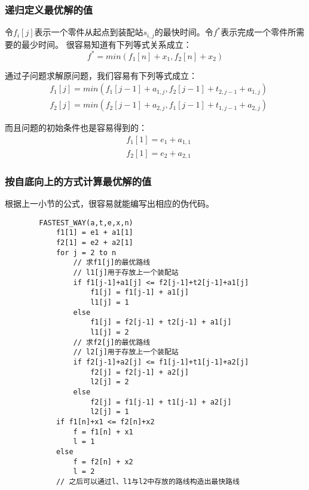 \documentclass[a4paper,left=2.5cm,right=2.5cm,11pt]{article}
\begin{document}
\subsubsection{递归定义最优解的值}
	令$f_i[j]$表示一个零件从起点到装配站$s_{i,j}$的最快时间。令$f^*$表示完成一个零件所需要的最少时间。
	很容易知道有下列等式关系成立：
	\begin{equation}
		f^* = min(f_1[n]+x_1,f_2[n]+x_2)
	\end{equation}

	通过子问题求解原问题，我们容易有下列等式成立：
	\begin{equation}
	\begin{split}
		&f_1[j] = min(f_1[j-1]+a_{1,j},f_2[j-1]+t_{2,j-1}+a_{1,j})\\ 
		&f_2[j] = min(f_2[j-1]+a_{2,j},f_1[j-1]+t_{1,j-1}+a_{2,j})
	\end{split}
	\end{equation}

	而且问题的初始条件也是容易得到的：
	\begin{equation}
		\begin{split}
			& f_1[1] = e_1 + a_{1,1}\\
			& f_2[1] = e_2 + a_{2,1}
		\end{split}
	\end{equation}

\subsubsection{按自底向上的方式计算最优解的值}
	根据上一小节的公式，很容易就能编写出相应的伪代码。
	\begin{lstlisting}
		FASTEST_WAY(a,t,e,x,n)
			f1[1] = e1 + a1[1]
			f2[1] = e2 + a2[1]
			for j = 2 to n
				// 求f1[j]的最优路线
				// l1[j]用于存放上一个装配站
				if f1[j-1]+a1[j] <= f2[j-1]+t2[j-1]+a1[j]
					f1[j] = f1[j-1] + a1[j]
					l1[j] = 1
				else
					f1[j] = f2[j-1] + t2[j-1] + a1[j]
					l1[j] = 2
				// 求f2[j]的最优路线
				// l2[j]用于存放上一个装配站
				if f2[j-1]+a2[j] <= f1[j-1]+t1[j-1]+a2[j]
					f2[j] = f2[j-1] + a2[j]
					l2[j] = 2
				else
					f2[j] = f1[j-1] + t1[j-1] + a2[j]
					l2[j] = 1 
			if f1[n]+x1 <= f2[n]+x2
				f = f1[n] + x1
				l = 1
			else
				f = f2[n] + x2
				l = 2
			// 之后可以通过l、l1与l2中存放的路线构造出最快路线
	\end{lstlisting}
\end{document}
